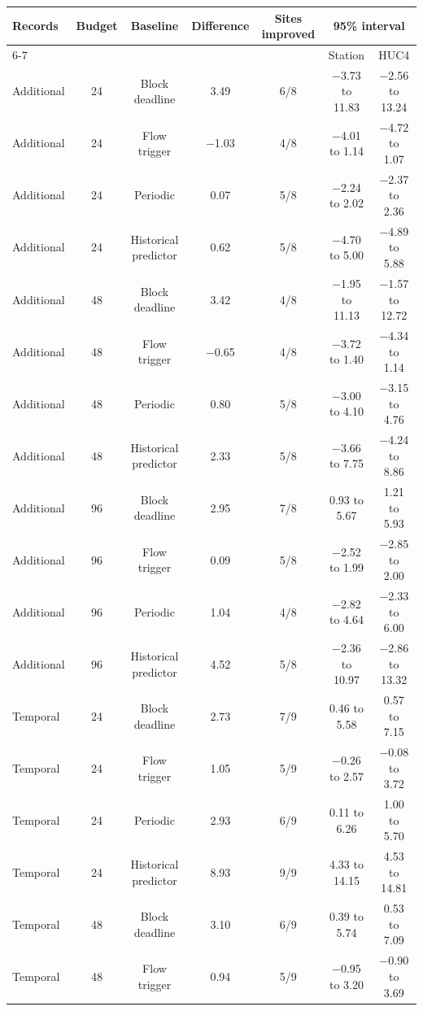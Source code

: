\documentclass[lineno,pdflatex,sn-apa]{sn-jnl}%
\theoremstyle{thmstyleone}%
\theoremstyle{thmstyletwo}%
\theoremstyle{thmstylethree}%
\begin{document}
\begin{center}
\footnotesize
\setlength{\tabcolsep}{2pt}
\begin{tabular}{@{}lcccccc@{}}
\toprule
Records & Budget & Baseline & Difference & Sites improved & \multicolumn{2}{c}{95\% interval} \\
\cmidrule(lr){6-7}
& & & & & Station & HUC4 \\
\midrule
Additional & 24 & Block deadline & 3.49 & 6/8 & $-$3.73 to 11.83 & $-$2.56 to 13.24\\
Additional & 24 & Flow trigger & $-$1.03 & 4/8 & $-$4.01 to 1.14 & $-$4.72 to 1.07\\
Additional & 24 & Periodic & 0.07 & 5/8 & $-$2.24 to 2.02 & $-$2.37 to 2.36\\
Additional & 24 & Historical predictor & 0.62 & 5/8 & $-$4.70 to 5.00 & $-$4.89 to 5.88\\
Additional & 48 & Block deadline & 3.42 & 4/8 & $-$1.95 to 11.13 & $-$1.57 to 12.72\\
Additional & 48 & Flow trigger & $-$0.65 & 4/8 & $-$3.72 to 1.40 & $-$4.34 to 1.14\\
Additional & 48 & Periodic & 0.80 & 5/8 & $-$3.00 to 4.10 & $-$3.15 to 4.76\\
Additional & 48 & Historical predictor & 2.33 & 5/8 & $-$3.66 to 7.75 & $-$4.24 to 8.86\\
Additional & 96 & Block deadline & 2.95 & 7/8 & 0.93 to 5.67 & 1.21 to 5.93\\
Additional & 96 & Flow trigger & 0.09 & 5/8 & $-$2.52 to 1.99 & $-$2.85 to 2.00\\
Additional & 96 & Periodic & 1.04 & 4/8 & $-$2.82 to 4.64 & $-$2.33 to 6.00\\
Additional & 96 & Historical predictor & 4.52 & 5/8 & $-$2.36 to 10.97 & $-$2.86 to 13.32\\
Temporal & 24 & Block deadline & 2.73 & 7/9 & 0.46 to 5.58 & 0.57 to 7.15\\
Temporal & 24 & Flow trigger & 1.05 & 5/9 & $-$0.26 to 2.57 & $-$0.08 to 3.72\\
Temporal & 24 & Periodic & 2.93 & 6/9 & 0.11 to 6.26 & 1.00 to 5.70\\
Temporal & 24 & Historical predictor & 8.93 & 9/9 & 4.33 to 14.15 & 4.53 to 14.81\\
Temporal & 48 & Block deadline & 3.10 & 6/9 & 0.39 to 5.74 & 0.53 to 7.09\\
Temporal & 48 & Flow trigger & 0.94 & 5/9 & $-$0.95 to 3.20 & $-$0.90 to 3.69\\

\end{tabular}
\end{center}
\end{document}
